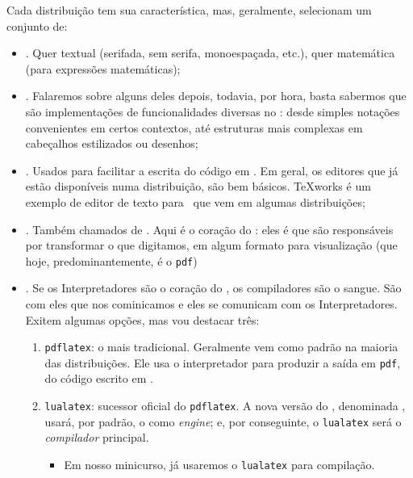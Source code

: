 Cada distribuição tem sua característica, mas, geralmente, selecionam um 
conjunto de: 
\begin{itemize}
  \item {}. Quer textual (serifada, sem serifa, monoespaçada, etc.), 
        quer matemática (para expressões matemáticas); 
  \item {}. Falaremos sobre alguns deles depois, todavia, por hora, 
        basta sabermos que são implementações de funcionalidades diversas no 
        \LaTeXX: desde simples notações convenientes em certos contextos, até 
        estruturas mais complexas em cabeçalhos estilizados ou desenhos; 
  \item {}. Usados para facilitar a escrita do código em \LaTeXX.
        Em geral, os editores que já estão disponíveis numa distribuição, são 
        bem básicos. 
        TeXworks é um exemplo de editor de texto para \LaTeXX\ que vem em algumas 
        distribuições; 
  \item {}. Também chamados de . 
        Aqui é o coração do \LaTeXX: eles é que são responsáveis por transformar 
        o que digitamos, em algum formato para visualização (que hoje, 
        predominantemente, é o \texttt{pdf})
  \item {}. Se os Interpretadores são o coração do \LaTeXX, 
        os compiladores são o sangue. 
        São com eles que nos cominicamos e eles se comunicam com os Interpretadores. 
        Exitem algumas opções, mas vou destacar três: 
        \begin{enumerate}
          \item \texttt{pdflatex}: o mais tradicional. 
                Geralmente vem como padrão na maioria das distribuições. 
                Ele usa o interpretador  para produzir a saída 
                em \texttt{pdf}, do código escrito em \LaTeXX. 
          \item \texttt{lualatex}: sucessor oficial do \texttt{pdflatex}. 
                A nova versão do \LaTeXX, denominada , usará, por 
                padrão, o  como \textit{engine}; e, por conseguinte, 
                o \texttt{lualatex} será o \textit{compilador} principal.  
                \begin{itemize}
                  \item[\emoji{warning}] Em nosso minicurso, já usaremos o 
                         \texttt{lualatex} para compilação. 

\end{itemize}
\end{enumerate}
\end{itemize}
